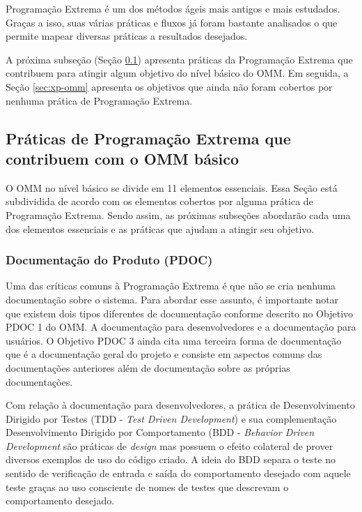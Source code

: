 Programação Extrema é um dos métodos ágeis mais antigos e mais
estudados. Graças a isso, suas várias práticas e fluxos já foram
bastante analisados o que permite mapear diversas práticas a
resultados desejados.

A próxima subseção (Seção \ref{sec:xp+omm}) apresenta
práticas da Programação Extrema que contribuem para atingir algum
objetivo do nível básico do OMM. Em seguida, a Seção \ref{sec:xp-omm}
apresenta os objetivos que ainda não foram cobertos por nenhuma
prática de Programação Extrema.

\subsection{Práticas de Programação Extrema que contribuem com o OMM
  básico}
\label{sec:xp+omm}

O OMM no nível básico se divide em 11 elementos essenciais. Essa Seção
está subdividida de acordo com os elementos cobertos por alguma prática
de Programação Extrema. Sendo assim, as próximas subseções abordarão
cada uma dos elementos essenciais e as práticas que ajudam a atingir
seu objetivo.

\subsubsection{Documentação do Produto (PDOC)}
\label{sec:+pdoc}

Uma das críticas comuns à Programação Extrema é que não se cria
nenhuma documentação sobre o sistema. Para abordar esse assunto, é
importante notar que existem dois tipos diferentes de documentação
conforme descrito no Objetivo PDOC 1 do OMM. A documentação para
desenvolvedores e a documentação para usuários. O Objetivo PDOC 3
ainda cita uma terceira forma de documentação que é a documentação
geral do projeto e consiste em aspectos comuns das documentações
anteriores além de documentação sobre as próprias documentações.

Com relação à documentação para desenvolvedores, a prática de
Desenvolvimento Dirigido por Testes (TDD - \textit{Test Driven
  Development}) e sua complementação Desenvolvimento Dirigido por
Comportamento (BDD - \textit{Behavior Driven Development} são práticas
de \textit{design} mas possuem o efeito colateral de prover diversos
exemplos de uso do código criado. A ideia do BDD separa o teste no
sentido de verificação de entrada e saída do comportamento desejado
com aquele teste graças ao uso consciente de nomes de testes que
descrevam o comportamento desejado.

